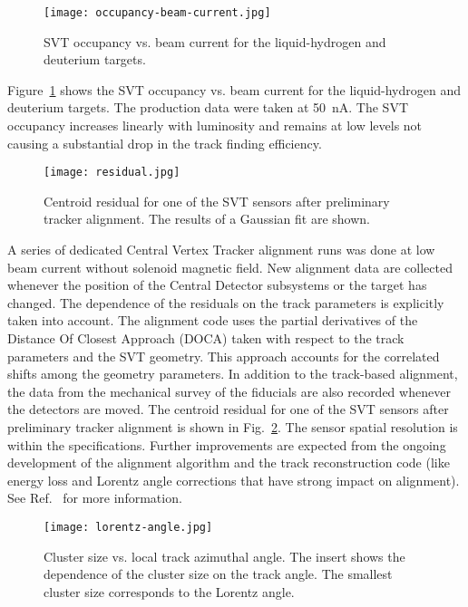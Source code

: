 \begin{figure}[hbt] 
\centering 
\texttt{[image: occupancy-beam-current.jpg]}
\caption{SVT occupancy vs. beam current for the liquid-hydrogen and deuterium targets.}
\label{fig:occupancy-beam-current}
\end{figure}

Figure~\ref{fig:occupancy-beam-current} shows the SVT occupancy vs. beam current for the liquid-hydrogen and
deuterium targets. The production data were taken at 50~nA. The SVT occupancy increases linearly with luminosity
and remains at low levels not causing a substantial drop in the track finding efficiency.

\begin{figure}[hbt] 
\centering 
\texttt{[image: residual.jpg]}
\caption{Centroid residual for one of the SVT sensors after preliminary tracker alignment. The results of a
  Gaussian fit are shown.}
\label{fig:residual}
\end{figure}

A series of dedicated Central Vertex Tracker alignment runs was done at low beam current without solenoid
magnetic field. New alignment data are collected whenever the position of the Central Detector subsystems or
the target has changed. The dependence of the residuals on the track parameters is explicitly taken into account.
The alignment code uses the partial derivatives of the Distance Of Closest Approach (DOCA) taken with respect
to the track parameters and the SVT geometry. This approach accounts for the correlated shifts among the
geometry parameters. In addition to the track-based alignment, the data from the mechanical survey of the
fiducials are also recorded whenever the detectors are moved. The centroid residual for one of the SVT sensors
after preliminary tracker alignment is shown in Fig.~\ref{fig:residual}. The sensor spatial resolution is within the
specifications. Further improvements are expected from the ongoing development of the alignment algorithm and
the track reconstruction code (like energy loss and Lorentz angle corrections that have strong impact on alignment).
See Ref.~\cite{recon-nim} for more information.

\begin{figure}[hbt] 
\centering 
\texttt{[image: lorentz-angle.jpg]}
\caption{Cluster size vs. local track azimuthal angle. The insert shows the dependence of the cluster size on the
  track angle. The smallest cluster size corresponds to the Lorentz angle.}
\label{fig:lorentz-angle}
\end{figure}


